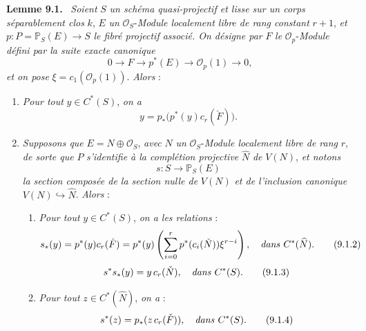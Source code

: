 \documentclass[11pt]{article}
\newenvironment{statement}[1]{\par\medskip\noindent\textbf{#1.}\ }{\par\medskip}
\begin{document}
\begin{statement}{Lemme 9.1}
\emph{Soient} $S$ \emph{un schéma quasi-projectif et lisse sur un corps séparablement clos} $k$, $E$ \emph{un} $\mathcal O_S$-\emph{Module localement libre de rang constant} $r+1$, \emph{et} $p:P=\mathbb P_S(E)\to S$ \emph{le fibré projectif associé. On désigne par} $F$ \emph{le} $\mathcal O_p$-\emph{Module défini par la suite exacte canonique}
\[
0\to F\to p^*(E)\to\mathcal O_p(1)\to0,
\tag{9.1.0}
\]
\emph{et on pose} $\xi=c_1(\mathcal O_p(1))$. \emph{Alors} :
\begin{enumerate}[label=(\roman*)]
\item \emph{Pour tout} $y\in C^*(S)$, \emph{on a}
\[
y=p_*\bigl(p^*(y)c_r(\check F)\bigr).
\tag{9.1.1}
\]
\item \emph{Supposons que} $E=N\oplus\mathcal O_S$, \emph{avec} $N$ \emph{un} $\mathcal O_S$-\emph{Module localement libre de rang} $r$, \emph{de sorte que} $P$ \emph{s'identifie à la complétion projective} $\widehat N$ \emph{de} $V(N)$, \emph{et notons}
\[
s:S\to\mathbb P_S(E)
\]
\emph{la section composée de la section nulle de} $V(N)$ \emph{et de l'inclusion canonique} $V(N)\hookrightarrow\widehat N$. \emph{Alors} :
\begin{enumerate}[label=(\alph*)]
\item \emph{Pour tout} $y\in C^*(S)$, \emph{on a les relations} :
\[
s_*(y)=p^*(y)c_r(\check F)=p^*(y)\left(\sum_{i=0}^r p^*(c_i(\check N))\xi^{r-i}\right),
\quad\text{\emph{dans} }C^*(\widehat N).
\tag{9.1.2}
\]
\[
s^*s_*(y)=y\,c_r(\check N),\quad\text{\emph{dans} }C^*(S).
\tag{9.1.3}
\]
\item
\emph{Pour tout} $z\in C^*(\widehat N)$, \emph{on a} :
\[
s^*(z)=p_*(z\,c_r(\check F)),\quad\text{\emph{dans} }C^*(S).
\tag{9.1.4}
\]
\end{enumerate}
\end{enumerate}
\end{statement}
\end{document}
